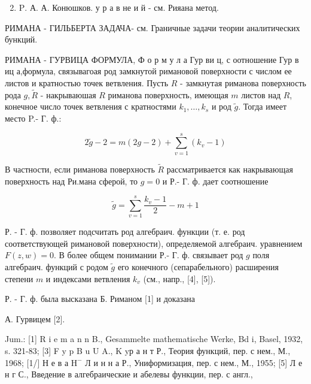 \documentclass[10pt]{article}
\begin{document}
\begin{enumerate}

  \setcounter{enumi}{1}

  \item $\mathrm{P}$. А. А. Конюшков. у р а в не и й - см. Рияана метод.

\end{enumerate}



РИМАНА - ГИЛЬБЕРТА ЗАДАЧА- см. Граничные задачи теории аналитических бункций.



РИМАНА - ГУРВИЦА ФОРМУЛА, Ф о р м у л а Гур ви ц, с оотношение Гур в иц а,формула, связывагоая род замкнутой римановой поверхности с числом ее листов и кратностью точек ветвления. Пусть $R$ - замкнутая риманова поверхность рода $g, \tilde{R}$ - накрываюшая $R$ риманова поверхность, имеющая $m$ листов над $R$, конечное число точек ветвления с кратностями $k_{1}, \ldots, k_{s}$ и род $\tilde{g}$. Тогда имеет место P.- Г. ф.:



\[

2 \tilde{g}-2=m(2 g-2)+\sum_{v=1}^{s}\left(k_{v}-1\right)

\]



В частности, если риманова поверхность $\tilde{R}$ рассматривается как накрывающая поверхность над Ри.мана сферой, то $g=0$ и Р.- Г. ф. дает соотношение



\[

\tilde{g}=\sum_{v=1}^{s} \frac{k_{v}-1}{2}-m+1

\]



Р. - Г. ф. позволяет подсчитать род алгебраич. функции (т. е. род соответствующей римановой поверхности), определяемой алгебраич. уравнением $F(z, w)=0$. В более общем понимании Р.- Г. ф. связывает род $g$ поля алгебраич. функций с родом $\tilde{g}$ его конечного (сепарабельного) расширения степени $m$ и индексами ветвления $k_{v}$ (см., напр., [4], [5]).



Р. - Г. ф. была высказана Б. Риманом [1] и доказана



А. Гурвицем [2].



Jum.: [1] R i e m a n n B., Gesammelte mathematische Werke, Bd i, Basel, 1932, s. 321-83; [3] F y p B u U A., K yр а н т Р., Теория функций, пер. с нем., М., 1968; [1/] Н е в а $\mathrm{H}^{-}$ Л и н н а Р., Униформизация, пер. с нем., М., 1955; [5] Л е н г С., Введение в алгебраические и абелевы функции, пер. с англ.,
\end{document}

